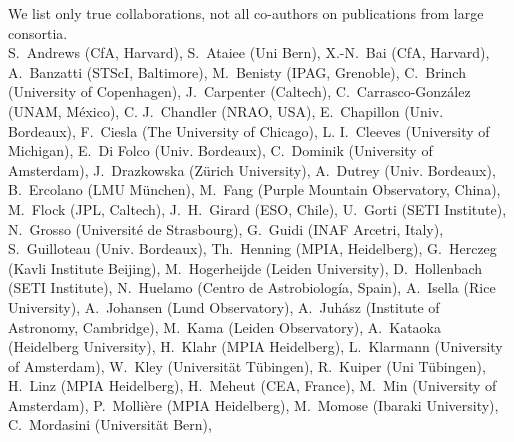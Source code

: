 \documentclass[10pt,fleqn,twoside]{article}
\begin{document}
{\small We list only true collaborations, not all co-authors on publications from 
large consortia.\\
S.~Andrews (CfA, Harvard),
S.~Ataiee (Uni Bern),
X.-N.~Bai (CfA, Harvard),
A.~Banzatti (STScI, Baltimore),
M.~Benisty (IPAG, Grenoble),
C.~Brinch (University of Copenhagen),
J.~Carpenter (Caltech),
C.~Carrasco-González (UNAM, México),
C. J.~Chandler (NRAO, USA),
E.~Chapillon (Univ. Bordeaux),
F.~Ciesla (The University of Chicago),
L. I.~Cleeves (University of Michigan),
E.~Di Folco (Univ. Bordeaux),
C.~Dominik (University of Amsterdam),
J.~Drazkowska (Zürich University),
A.~Dutrey (Univ. Bordeaux),
B.~Ercolano (LMU München),
M.~Fang (Purple Mountain Observatory, China),
M.~Flock (JPL, Caltech),
J.~H.~Girard (ESO, Chile),
U.~Gorti (SETI Institute),
N.~Grosso (Université de Strasbourg),
G.~Guidi (INAF Arcetri, Italy),
S.~Guilloteau (Univ. Bordeaux),
Th.~Henning (MPIA, Heidelberg),
G.~Herczeg (Kavli Institute Beijing),
M.~Hogerheijde (Leiden University),
D.~Hollenbach (SETI Institute),
N.~Huelamo (Centro de Astrobiología, Spain),
A.~Isella (Rice University),
A.~Johansen (Lund Observatory),
A.~Juh\'asz (Institute of Astronomy, Cambridge),
M.~Kama (Leiden Observatory),
A.~Kataoka (Heidelberg University),
H.~Klahr (MPIA Heidelberg),
L.~Klarmann (University of Amsterdam),
W.~Kley (Universität Tübingen),
R.~Kuiper (Uni T\"ubingen),
H.~Linz (MPIA Heidelberg),
H.~Meheut (CEA, France),
M.~Min (University of Amsterdam),
P.~Molli\`ere (MPIA Heidelberg),
M.~Momose (Ibaraki University),
C.~Mordasini (Universität Bern),
}
\end{document}
